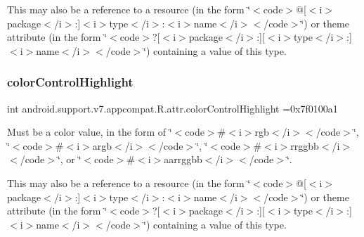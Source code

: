 This may also be a reference to a resource (in the form \char`\"{}$<$code$>$@\mbox{[}$<$i$>$package$<$/i$>$\+:\mbox{]}$<$i$>$type$<$/i$>$\+:$<$i$>$name$<$/i$>$$<$/code$>$\char`\"{}) or theme attribute (in the form \char`\"{}$<$code$>$?\mbox{[}$<$i$>$package$<$/i$>$\+:\mbox{]}\mbox{[}$<$i$>$type$<$/i$>$\+:\mbox{]}$<$i$>$name$<$/i$>$$<$/code$>$\char`\"{}) containing a value of this type. \mbox{\label{classandroid_1_1support_1_1v7_1_1appcompat_1_1R_1_1attr_a81fd6db47694d2d9f1c8ce4109695892}} 
\subsubsection{\texorpdfstring{color\+Control\+Highlight}{colorControlHighlight}}
{\footnotesize\ttfamily int android.\+support.\+v7.\+appcompat.\+R.\+attr.\+color\+Control\+Highlight =0x7f0100a1\hspace{0.3cm}{\ttfamily [static]}}

Must be a color value, in the form of \char`\"{}$<$code$>$\#$<$i$>$rgb$<$/i$>$$<$/code$>$\char`\"{}, \char`\"{}$<$code$>$\#$<$i$>$argb$<$/i$>$$<$/code$>$\char`\"{}, \char`\"{}$<$code$>$\#$<$i$>$rrggbb$<$/i$>$$<$/code$>$\char`\"{}, or \char`\"{}$<$code$>$\#$<$i$>$aarrggbb$<$/i$>$$<$/code$>$\char`\"{}. 

This may also be a reference to a resource (in the form \char`\"{}$<$code$>$@\mbox{[}$<$i$>$package$<$/i$>$\+:\mbox{]}$<$i$>$type$<$/i$>$\+:$<$i$>$name$<$/i$>$$<$/code$>$\char`\"{}) or theme attribute (in the form \char`\"{}$<$code$>$?\mbox{[}$<$i$>$package$<$/i$>$\+:\mbox{]}\mbox{[}$<$i$>$type$<$/i$>$\+:\mbox{]}$<$i$>$name$<$/i$>$$<$/code$>$\char`\"{}) containing a value of this type. \mbox{\label{classandroid_1_1support_1_1v7_1_1appcompat_1_1R_1_1attr_a417dcb097ebfc94abe730fdbe0a8b424}} 
